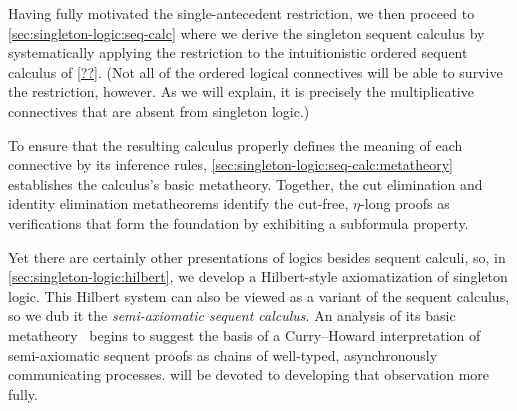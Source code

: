 Having fully motivated the single-antecedent restriction, we then proceed to \cref{sec:singleton-logic:seq-calc} where we derive the singleton sequent calculus by systematically applying the restriction to the intuitionistic ordered sequent calculus of \cref{??}.
(Not all of the ordered logical connectives will be able to survive the restriction, however.
As we will explain, it is precisely the multiplicative connectives that are absent from singleton logic.)

To ensure that the resulting calculus properly defines the meaning of each connective by its inference rules, \cref{sec:singleton-logic:seq-calc:metatheory} establishes the calculus's basic metatheory.
Together, the cut elimination and identity elimination metatheorems identify the cut-free, $\eta$-long proofs as verifications that form the foundation by exhibiting a subformula property.


Yet there are certainly other presentations of logics besides sequent calculi, so, in \cref{sec:singleton-logic:hilbert}, we develop a Hilbert-style axiomatization of singleton logic.
This Hilbert system can also be viewed as a variant of the sequent calculus, so we dub it the \emph{semi-axiomatic sequent calculus}\autocite{DeYoung+:FSCD20}.
An analysis of its basic metatheory~ begins to suggest the basis of a Curry--Howard interpretation of semi-axiomatic sequent proofs as chains of well-typed, asynchronously communicating processes.
 will be devoted to developing that observation more fully.




